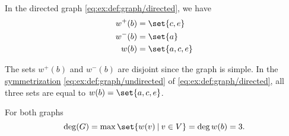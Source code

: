 \begin{example}\label{ex:def:graph_incidence}
  In the directed graph \eqref{eq:ex:def:graph/directed}, we have
  \begin{align*}
    w^+(b) &= \set{ c, e } \\
    w^-(b) &= \set{ a } \\
    w(b)   &= \set{ a, c, e }
  \end{align*}

  The sets \( w^+(b) \) and \( w^-(b) \) are disjoint since the graph is simple. In the \hyperref[rem:undirected_graphs_as_directed]{symmetrization} \eqref{eq:ex:def:graph/undirected} of \eqref{eq:ex:def:graph/directed}, all three sets are equal to \( w(b) = \set{ a, c, e } \).

  For both graphs
  \begin{equation*}
    \deg(G) = \max\set{ w(v) \given v \in V } = \deg w(b) = 3.
  \end{equation*}
\end{example}

